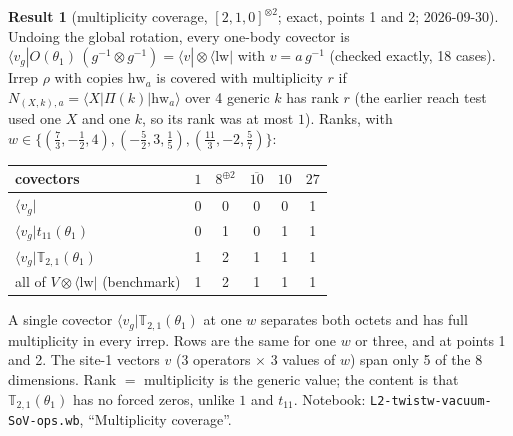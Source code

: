 \documentclass[11pt]{article}
\newcommand{\nb}[1]{\texttt{#1}}
\theoremstyle{definition}
\newtheorem{result}{Result}
\theoremstyle{remark}
\begin{document}
\begin{result}[{multiplicity coverage, $[2,1,0]^{\otimes2}$; exact, points 1 and 2; 2026-09-30}]
Undoing the global rotation, every one-body covector is $\langle v_g|O(\theta_1)\,(g^{-1}\otimes g^{-1})=\langle v|\otimes\langle\mathrm{lw}|$ with $v=a\,g^{-1}$ (checked exactly, 18 cases). Irrep $\rho$ with copies $\mathrm{hw}_a$ is covered with multiplicity $r$ if $N_{(X,k),a}=\langle X|\Pi(k)|\mathrm{hw}_a\rangle$ over 4 generic $k$ has rank $r$ (the earlier reach test used one $X$ and one $k$, so its rank was at most $1$). Ranks, with $w\in\{(\tfrac73,-\tfrac12,4),(-\tfrac52,3,\tfrac15),(\tfrac{11}3,-2,\tfrac57)\}$:
\begin{center}
\begin{tabular}{lccccc}\toprule
covectors & $1$ & $8^{\oplus2}$ & $\overline{10}$ & $10$ & $27$\\\midrule
$\langle v_g|$ & 0 & 0 & 0 & 0 & 1\\
$\langle v_g|t_{11}(\theta_1)$ & 0 & 1 & 0 & 1 & 1\\
$\langle v_g|\mathbb T_{2,1}(\theta_1)$ & 1 & 2 & 1 & 1 & 1\\
all of $V\otimes\langle\mathrm{lw}|$ (benchmark) & 1 & 2 & 1 & 1 & 1\\\bottomrule
\end{tabular}
\end{center}
A single covector $\langle v_g|\mathbb T_{2,1}(\theta_1)$ at one $w$ separates both octets and has full multiplicity in every irrep. Rows are the same for one $w$ or three, and at points 1 and 2. The site-1 vectors $v$ (3 operators $\times$ 3 values of $w$) span only 5 of the 8 dimensions. Rank $=$ multiplicity is the generic value; the content is that $\mathbb T_{2,1}(\theta_1)$ has no forced zeros, unlike $1$ and $t_{11}$. Notebook: \nb{L2-twistw-vacuum-SoV-ops.wb}, ``Multiplicity coverage''.
\end{result}
\end{document}
